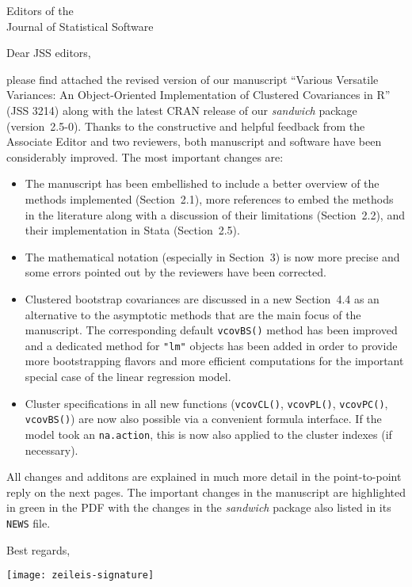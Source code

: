 \documentclass[american,foldmarks=false]{uibklttr}
\let\code=\texttt
\begin{document}
\begin{letter}{
Editors of the\\
Journal of Statistical Software}



\opening{Dear JSS editors,}

please find attached the revised version of our manuscript ``Various Versatile
Variances: An Object-Oriented Implementation of Clustered Covariances in R''
(JSS 3214) along with the latest CRAN release of our \emph{sandwich} package
(version~2.5-0). Thanks to the constructive and helpful feedback from the
Associate Editor and two reviewers, both manuscript and software have been
considerably improved. The most important changes are:
\begin{itemize}

\item The manuscript has been embellished to include a better overview of
  the methods implemented (Section~2.1), more references to embed the methods
  in the literature along with a discussion of their limitations (Section~2.2),
  and their implementation in Stata (Section~2.5).

\item The mathematical notation (especially in Section~3) is now more
  precise and some errors pointed out by the reviewers have been corrected.

\item Clustered bootstrap covariances are discussed in a new Section~4.4
  as an alternative to the asymptotic methods that are the main focus of the
  manuscript. The corresponding default \code{vcovBS()}
  method has been improved and a dedicated method for \code{"lm"} objects
  has been added in order to provide more bootstrapping flavors and more
  efficient computations for the important special case of the linear regression
  model.
  
\item Cluster specifications in all new functions (\code{vcovCL()},
  \code{vcovPL()}, \code{vcovPC()}, \code{vcovBS()}) are now also possible
  via a convenient formula interface. If the model took an \code{na.action},
  this is now also applied to the cluster indexes (if necessary).

\end{itemize}

All changes and additons are explained in much more detail in the
point-to-point reply on the next pages. The important changes in the manuscript
are highlighted in green in the PDF with the changes in the \emph{sandwich}
package also listed in its \code{NEWS} file.

\closing{Best regards,
\vspace*{1cm}
}

\vspace*{-2.8cm}
\hspace*{-0.3cm}\texttt{[image: zeileis-signature]}

\end{letter}
\end{document}
